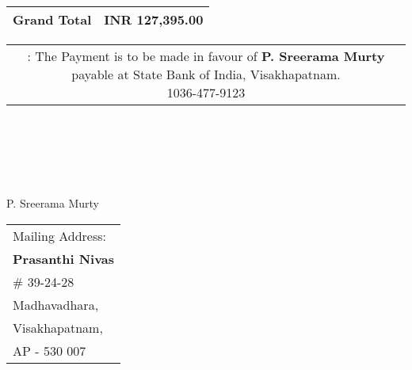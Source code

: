 \documentclass[11pt]{article}
\begin{document}
\vspace*{0.45cm}

\hspace*{11.9cm}
\begin{tabular}{|c|r|}
\hline
{\bf Grand Total} & INR 127,395.00 \\
\hline
\end{tabular}

\vspace*{-0.45cm}
\hspace*{-0.65cm}
\begin{tabular}{c}
\parbox{4in}{ : The Payment is to be made in favour of {\bf P. Sreerama Murty} payable at State Bank of India, Visakhapatnam. \\
 1036-477-9123}\\
\end{tabular}
\vspace*{75pt}


 \\ \\ \\ \\ \\
 \hspace*{0.2cm}P. Sreerama Murty
\vspace*{-71pt}
\begin{flushright}
\begin{tabular}{l}
Mailing Address:\\
{\bf Prasanthi Nivas}\\
\# 39-24-28\\
Madhavadhara, \\ 
Visakhapatnam, \\
AP - 530 007\\
\end{tabular}
\end{flushright}
\end{document}
